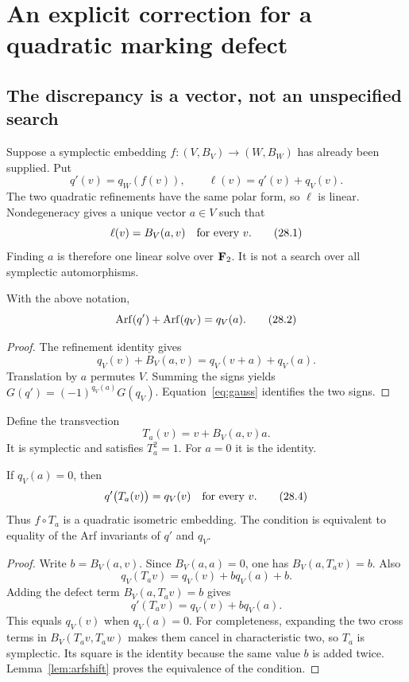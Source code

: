 \section{An explicit correction for a quadratic marking defect}\label{sec:correction}
\subsection{The discrepancy is a vector, not an unspecified search}
Suppose a symplectic embedding $f:(V,B_V)\to(W,B_W)$ has already been supplied. Put
\[
 q'(v)=q_W(f(v)),\qquad \ell(v)=q'(v)+q_V(v).
\]
The two quadratic refinements have the same polar form, so $\ell$ is linear. Nondegeneracy gives a unique vector $a\in V$ such that
\[
 \ell(v)=B_V(a,v)\quad\hbox{for every }v.
 \tag{28.1}\label{eq:defect}
\]
Finding $a$ is therefore one linear solve over $\mathbf F_2$. It is not a search over all symplectic automorphisms.

\begin{lemma}\label{lem:arfshift}
With the above notation,
\[
 \operatorname{Arf}(q')+\operatorname{Arf}(q_V)=q_V(a).
 \tag{28.2}\label{eq:arfshift}
\]
\end{lemma}
\begin{proof}
The refinement identity gives
\[
 q_V(v)+B_V(a,v)=q_V(v+a)+q_V(a).
\]
Translation by $a$ permutes $V$. Summing the signs yields $G(q')=(-1)^{q_V(a)}G(q_V)$. Equation~\eqref{eq:gauss} identifies the two signs.
\end{proof}

Define the transvection
\[
 T_a(v)=v+B_V(a,v)a.
 \tag{28.3}\label{eq:transvection}
\]
It is symplectic and satisfies $T_a^2=1$. For $a=0$ it is the identity.

\begin{proposition}\label{prop:transvection}
If $q_V(a)=0$, then
\[
 q'\bigl(T_a(v)\bigr)=q_V(v)\quad\hbox{for every }v.
 \tag{28.4}\label{eq:corrected}
\]
Thus $f\circ T_a$ is a quadratic isometric embedding. The condition is equivalent to equality of the Arf invariants of $q'$ and $q_V$.
\end{proposition}
\begin{proof}
Write $b=B_V(a,v)$. Since $B_V(a,a)=0$, one has $B_V(a,T_av)=b$. Also
\[
 q_V(T_av)=q_V(v)+bq_V(a)+b.
\]
Adding the defect term $B_V(a,T_av)=b$ gives
\[
 q'(T_av)=q_V(v)+bq_V(a).
\]
This equals $q_V(v)$ when $q_V(a)=0$. For completeness, expanding the two cross terms in $B_V(T_av,T_aw)$ makes them cancel in characteristic two, so $T_a$ is symplectic. Its square is the identity because the same value $b$ is added twice. Lemma~\ref{lem:arfshift} proves the equivalence of the condition.
\end{proof}

